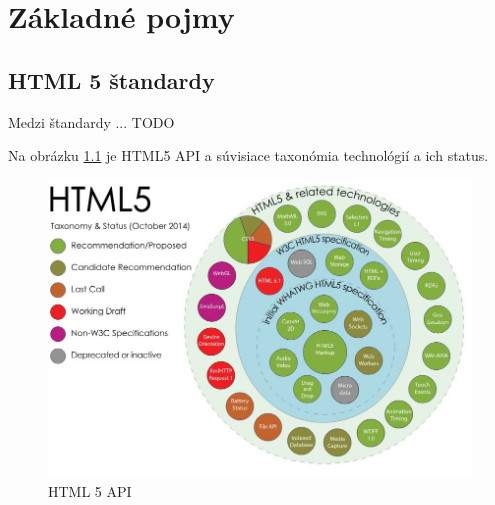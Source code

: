 \chapter{Základné pojmy}




\section{\acs{HTML} 5 štandardy}

Medzi štandardy ... TODO

Na obrázku \ref{fig:obrazokHTML} je HTML5 API a súvisiace taxonómia technológií a ich status. 

\begin{figure}
\centering
\includegraphics[width=0.7\linewidth]{obrazky/obrazokHTML}
\caption{HTML 5 API}
\label{fig:obrazokHTML}
\end{figure}







